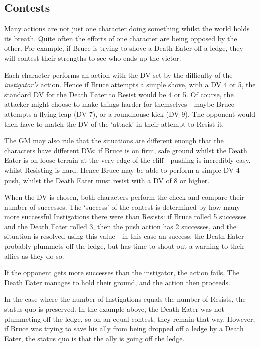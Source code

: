 \subsection{Contests} 

Many actions are not just one character doing something whilst the world holds its breath. Quite often the efforts of one character are being opposed by the other. For example, if Bruce is trying to shove a Death Eater off a ledge, they will contest their strengths to see who ends up the victor. 

Each character performs an action with the DV set by the difficulty of the {\it instigator's} action. Hence if Bruce attempts a simple shove, with a DV 4 or 5, the standard DV for the Death Eater to Resist would be 4 or 5. Of course, the attacker might choose to make things harder for themselves - maybe Bruce attempts a flying leap (DV 7), or a roundhouse kick (DV 9). The opponent would then have to match the DV of the `attack' in their attempt to Resist it. 

The GM may also rule that the situations are different enough that the characters have different DVs: if Bruce is on firm, safe ground whilst the Death Eater is on loose terrain at the very edge of the cliff - pushing is incredibly easy, whilst Resisting is hard. Hence Bruce may be able to perform a simple DV 4 push, whilst the Death Eater must resist with a DV of 8 or higher. 

When the DV is chosen, both characters perform the check and compare their number of successes. The `success' of the contest is determined by how many more successful Instigations there were than Resists: if Bruce rolled 5 successes and the Death Eater rolled 3, then the push action has 2 successes, and the situation is resolved using this value - in this case an  success: the Death Eater probably plummets off the ledge, but has time to shout out a warning to their allies as they do so.

If the opponent gets more successes than the instigator, the action fails. The Death Eater manages to hold their ground, and the action then proceeds. 

In the case where the number of Instigations equals the number of Resists, the status quo is preserved. In the example above, the Death Eater was not plummeting off the ledge, so on an equal-contest, they remain that way. However, if Bruce was trying to save his ally from being dropped off a ledge by a Death Eater, the status quo is that the ally is going off the ledge. 

